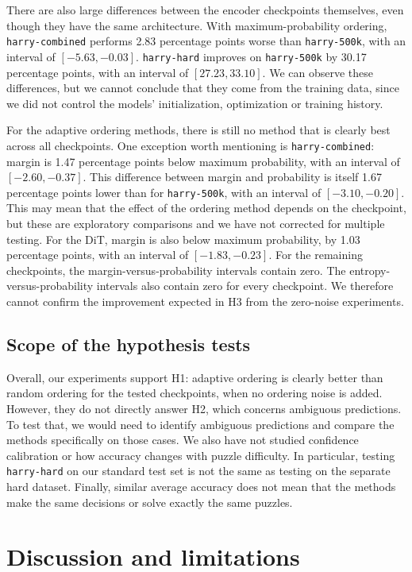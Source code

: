 \documentclass{article}
\begin{document}
There are also large differences between the encoder checkpoints themselves,
even though they have the same architecture. With maximum-probability
ordering, \texttt{harry-combined} performs 2.83 percentage points worse
than \texttt{harry-500k}, with an interval of $[-5.63,-0.03]$.
\texttt{harry-hard} improves on \texttt{harry-500k} by 30.17 percentage
points, with an interval of $[27.23,33.10]$. We can observe these differences,
but we cannot conclude that they come from the training data, since we did
not control the models' initialization, optimization or training history.

For the adaptive ordering methods, there is still no method that is clearly
best across all checkpoints. One exception worth mentioning is
\texttt{harry-combined}: margin is 1.47 percentage points below maximum
probability, with an interval of $[-2.60,-0.37]$. This difference between
margin and probability is itself 1.67 percentage points lower than for
\texttt{harry-500k}, with an interval of $[-3.10,-0.20]$. This may mean that
the effect of the ordering method depends on the checkpoint, but these are
exploratory comparisons and we have not corrected for multiple testing.
For the DiT, margin is also below maximum probability, by 1.03 percentage
points, with an interval of $[-1.83,-0.23]$. For the remaining checkpoints,
the margin-versus-probability intervals contain zero.
The entropy-versus-probability intervals also contain zero for every
checkpoint. We therefore cannot confirm the improvement expected in H3
from the zero-noise experiments.

\subsection{Scope of the hypothesis tests}
Overall, our experiments support H1: adaptive ordering is clearly better
than random ordering for the tested checkpoints, when no ordering noise is
added. However, they do not directly answer H2, which concerns ambiguous
predictions. To test that, we would need to identify ambiguous predictions
and compare the methods specifically on those cases. We also have not studied
confidence calibration or how accuracy changes with puzzle difficulty.
In particular, testing \texttt{harry-hard} on our standard test set is not
the same as testing on the separate hard dataset. Finally, similar average
accuracy does not mean that the methods make the same decisions or solve
exactly the same puzzles.

\section{Discussion and limitations}
\label{sec:discussion}
\end{document}
